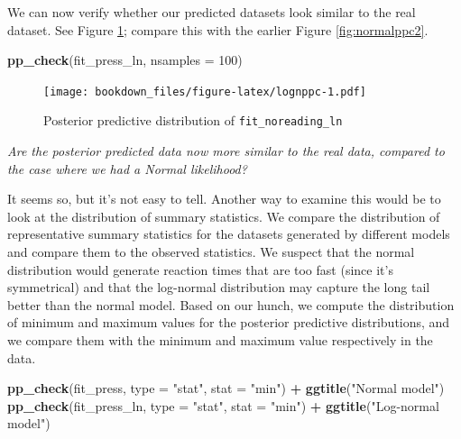 \documentclass[12pt,]{krantz}
\newenvironment{Shaded}{\begin{snugshade}}{\end{snugshade}}
\newcommand{\DataTypeTok}[1]{\textcolor[rgb]{0.13,0.29,0.53}{#1}}
\newcommand{\DecValTok}[1]{\textcolor[rgb]{0.00,0.00,0.81}{#1}}
\newcommand{\KeywordTok}[1]{\textcolor[rgb]{0.13,0.29,0.53}{\textbf{#1}}}
\newcommand{\NormalTok}[1]{#1}
\newcommand{\OperatorTok}[1]{\textcolor[rgb]{0.81,0.36,0.00}{\textbf{#1}}}
\newcommand{\StringTok}[1]{\textcolor[rgb]{0.31,0.60,0.02}{#1}}
\theoremstyle{definition}
\theoremstyle{definition}
\theoremstyle{definition}
\theoremstyle{remark}
\begin{document}
We can now verify whether our predicted datasets look similar to
the real dataset. See Figure \ref{fig:lognppc}; compare this with the earlier Figure \ref{fig:normalppc2}.



\begin{Shaded}
\begin{Highlighting}[]
\KeywordTok{pp_check}\NormalTok{(fit_press_ln, }\DataTypeTok{nsamples =} \DecValTok{100}\NormalTok{)}
\end{Highlighting}
\end{Shaded}

\begin{figure}
\centering
\texttt{[image: bookdown\_files/figure-latex/lognppc-1.pdf]}
\caption{\label{fig:lognppc}Posterior predictive distribution of \texttt{fit\_noreading\_ln}}
\end{figure}

\emph{Are the posterior predicted data now more similar to the real data, compared to the case where we had a Normal likelihood?}

It seems so, but it's not easy to tell. Another way to examine this would be to look at the distribution of summary statistics. We compare the distribution of representative summary statistics for the datasets generated by different models and compare them to the observed statistics. We suspect that the normal distribution would generate reaction times that are too fast (since it's symmetrical) and that the log-normal distribution may capture the long tail better than the normal model. Based on our hunch, we compute the distribution of minimum and maximum values for the posterior predictive distributions, and we compare them with the minimum and maximum value respectively in the data.

\begin{Shaded}
\begin{Highlighting}[]
\KeywordTok{pp_check}\NormalTok{(fit_press, }\DataTypeTok{type =} \StringTok{"stat"}\NormalTok{, }\DataTypeTok{stat =} \StringTok{"min"}\NormalTok{) }\OperatorTok{+}\StringTok{ }\KeywordTok{ggtitle}\NormalTok{(}\StringTok{"Normal model"}\NormalTok{)}
\KeywordTok{pp_check}\NormalTok{(fit_press_ln, }\DataTypeTok{type =} \StringTok{"stat"}\NormalTok{, }\DataTypeTok{stat =} \StringTok{"min"}\NormalTok{) }\OperatorTok{+}\StringTok{ }\KeywordTok{ggtitle}\NormalTok{(}\StringTok{"Log-normal model"}\NormalTok{)}
\end{Highlighting}
\end{Shaded}
\end{document}
